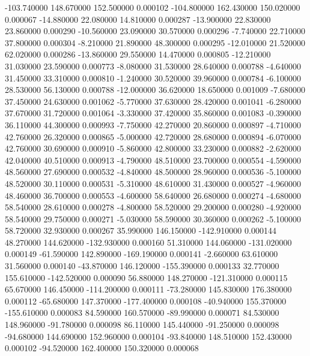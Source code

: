 -103.740000 148.670000 152.500000 0.000102 
-104.800000 162.430000 150.020000 0.000067 
-14.880000 22.080000 14.810000 0.000287 
-13.900000 22.830000 23.860000 0.000290 
-10.560000 23.090000 30.570000 0.000296 
-7.740000 22.710000 37.800000 0.000304 
-8.210000 21.890000 48.300000 0.000295 
-12.010000 21.520000 62.020000 0.000286 
-13.860000 29.550000 14.470000 0.000805 
-12.210000 31.030000 23.590000 0.000773 
-8.080000 31.530000 28.640000 0.000788 
-4.640000 31.450000 33.310000 0.000810 
-1.240000 30.520000 39.960000 0.000784 
-6.100000 28.530000 56.130000 0.000788 
-12.000000 36.620000 18.650000 0.001009 
-7.680000 37.450000 24.630000 0.001062 
-5.770000 37.630000 28.420000 0.001041 
-6.280000 37.670000 31.720000 0.001064 
-3.330000 37.420000 35.860000 0.001083 
-0.390000 36.110000 44.300000 0.000993 
-7.750000 42.270000 20.860000 0.000897 
-4.710000 42.760000 26.320000 0.000865 
-5.000000 42.720000 28.680000 0.000894 
-6.070000 42.760000 30.690000 0.000910 
-5.860000 42.800000 33.230000 0.000882 
-2.620000 42.040000 40.510000 0.000913 
-4.790000 48.510000 23.700000 0.000554 
-4.590000 48.560000 27.690000 0.000532 
-4.840000 48.500000 28.960000 0.000536 
-5.100000 48.520000 30.110000 0.000531 
-5.310000 48.610000 31.430000 0.000527 
-4.960000 48.460000 36.700000 0.000553 
-4.600000 58.640000 26.680000 0.000274 
-4.680000 58.540000 28.610000 0.000278 
-4.800000 58.520000 29.200000 0.000280 
-4.920000 58.540000 29.750000 0.000271 
-5.030000 58.590000 30.360000 0.000262 
-5.100000 58.720000 32.930000 0.000267 
35.990000 146.150000 -142.910000 0.000144 
48.270000 144.620000 -132.930000 0.000160 
51.310000 144.060000 -131.020000 0.000149 
-61.590000 142.890000 -169.190000 0.000141 
-2.660000 63.610000 31.560000 0.000140 
-43.870000 146.120000 -155.390000 0.000133 
32.770000 155.610000 -142.520000 0.000090 
56.880000 148.270000 -121.310000 0.000115 
65.670000 146.450000 -114.200000 0.000111 
-73.280000 145.830000 176.380000 0.000112 
-65.680000 147.370000 -177.400000 0.000108 
-40.940000 155.370000 -155.610000 0.000083 
84.590000 160.570000 -89.990000 0.000071 
84.530000 148.960000 -91.780000 0.000098 
86.110000 145.440000 -91.250000 0.000098 
-94.680000 144.690000 152.960000 0.000104 
-93.840000 148.510000 152.430000 0.000102 
-94.520000 162.400000 150.320000 0.000068 
